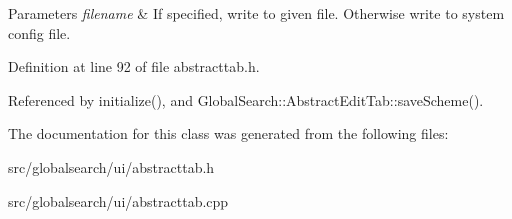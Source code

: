 \begin{DoxyParams}{Parameters}
{\em filename} & If specified, write to given file. Otherwise write to system config file. \\
\hline
\end{DoxyParams}


Definition at line 92 of file abstracttab.\-h.



Referenced by initialize(), and Global\-Search\-::\-Abstract\-Edit\-Tab\-::save\-Scheme().



The documentation for this class was generated from the following files\-:\begin{DoxyCompactItemize}
\item 
src/globalsearch/ui/abstracttab.\-h\item 
src/globalsearch/ui/abstracttab.\-cpp\end{DoxyCompactItemize}
